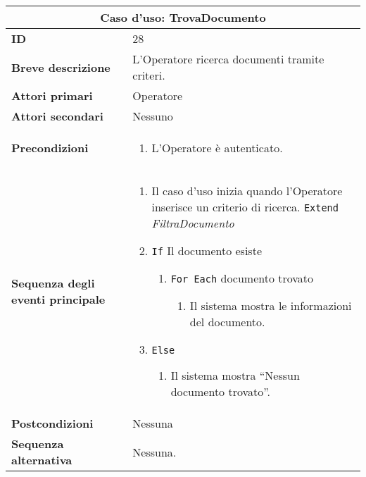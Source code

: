 \documentclass[a4paper]{report}
\begin{document}
\clearpage
\begin{table}[H]
\vspace*{-0cm}
\renewcommand{\arraystretch}{1.9}
\begin{tabular}{|p{3.9cm}|p{9.9cm}|}
\hline
\multicolumn{2}{|c|}{\textbf{Caso d’uso: TrovaDocumento}} \\ \hline
	\textbf{ID} & 28 \\ \hline
	\textbf{Breve descrizione} & L’Operatore ricerca documenti tramite criteri. \\ \hline
	\textbf{Attori primari} & Operatore \\ \hline
	\textbf{Attori secondari} & Nessuno \\ \hline
	\textbf{Precondizioni} & \begin{enumerate}[leftmargin=14pt,label=\arabic*.,labelsep=0.5em,topsep=0pt,partopsep=0pt,parsep=0pt,itemsep=0pt]
        \item L’Operatore è autenticato.
    \end{enumerate} \\ \hline
	\textbf{Sequenza degli eventi principale} & 
\begin{enumerate}[leftmargin=14pt,label=\arabic*.,labelsep=0.5em,topsep=0pt,partopsep=0pt,parsep=0pt,itemsep=0pt]
    \item Il caso d’uso inizia quando l’Operatore inserisce un criterio di ricerca. \newline
    \texttt{Extend} \textit{FiltraDocumento}
    \item \texttt{If} Il documento esiste
    \begin{enumerate}[label=\arabic{enumi}.\arabic*.,leftmargin=22pt,labelsep=0.5em,topsep=0pt,partopsep=0pt,parsep=0pt,itemsep=0pt]
        \item \texttt{For Each} documento trovato
        \begin{enumerate}[label=\arabic{enumi}.\arabic{enumii}.\arabic*.,leftmargin=22pt,labelsep=0.5em,topsep=0pt,partopsep=0pt,parsep=0pt,itemsep=0pt]
            \item Il sistema mostra le informazioni del documento.
        \end{enumerate}
    \end{enumerate}
    \item \texttt{Else}
    \begin{enumerate}[label=\arabic{enumi}.\arabic*.,leftmargin=22pt,labelsep=0.5em,topsep=0pt,partopsep=0pt,parsep=0pt,itemsep=0pt]
        \item Il sistema mostra “Nessun documento trovato”.
    \end{enumerate}
\end{enumerate}\\ \hline
	\textbf{Postcondizioni} & Nessuna \\ \hline
	\textbf{Sequenza alternativa} & Nessuna. \\ \hline
\end{tabular}
\end{table}
\end{document}
